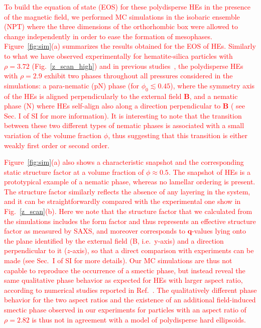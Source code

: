 \documentclass[aps,prl,preprint,superscriptaddress]{revtex4-1} %
\begin{document}
\textcolor{red}{To build the equation of state (EOS) for these polydisperse HEs in the presence of the magnetic field, we performed MC simulations in the isobaric ensemble (NPT) where the three
dimensions of the orthorhombic box were allowed to change independently in order to ease the formation of mesophases. Figure~\ref{fig:sim}(a) summarizes the results obtained for the EOS of HEs. Similarly to what we have observed experimentally for hematite-silica particles with $\rho=3.72$ (Fig.~\ref{z_scan_high}) and in previous studies~\cite{martchenko2016anisotropic}, 
the polydisperse HEs with $\rho = 2.9$ exhibit two phases throughout all pressures considered in the simulations:  
a para-nematic (pN) phase (for $\phi_0\lesssim 0.45$), where the symmetry axis of the HEs is aligned perpendicularly to the 
external field $\mathbf{B}$, and a nematic phase (N) where HEs self-align also along a direction perpendicular to $\mathbf{B}$ 
({\color{green} see Sec. I of SI for more information}). It is interesting to note that the transition between these two different types of nematic phases is associated with a small variation of the volume fraction $\phi$,
thus suggesting that this transition is either weakly first order or second order.}

\textcolor{red}{Figure~\ref{fig:sim}(a) also shows a characteristic snapshot and the corresponding static structure factor at a volume fraction of $\phi \approx 0.5$. The snapshot of HEs is a prototypical example of a nematic phase, whereas no lamellar ordering is present. 
The structure factor similarly reflects the absence of any layering in the system, and it can 
be straightforwardly compared with the experimental one show in Fig.~\ref{z_scan}(b). Here we note that the structure factor that we calculated from the simulations
includes the form factor and thus represents an effective structure factor as measured by SAXS, and moreover corresponds to $\mathbf{q}$-values lying onto the plane identified by the external field (B, i.e.~y-axis) and 
a direction perpendicular to it ($z$-axis), so that a direct comparison with experiments can be made ({\color{green}see Sec.~I of SI for more details}).
Our MC simulations are thus not capable to reproduce the occurrence of a smectic phase, but instead reveal the same qualitative phase behavior as expected for HEs with larger aspect ratio, according to numerical studies reported in Ref.~\cite{martchenko2016anisotropic}. The qualitatively different phase behavior for the two aspect ratios and the existence of an additional field-induced smectic phase observed in our experiments for particles with an aspect ratio of $\rho = 2.82$ is thus not in agreement with a model of polydisperse hard ellipsoids. }
\end{document}
